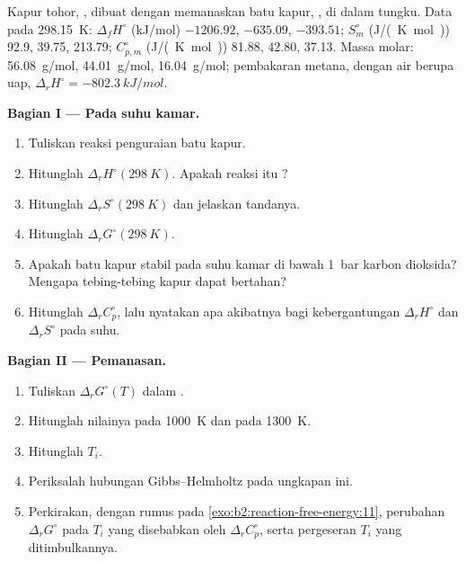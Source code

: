 \begin{problem}
\label{pb:b2:reaction-free-energy:1}
Kapur tohor, , dibuat dengan memanaskan batu kapur, ,
di dalam tungku. Data pada \qty{298.15}{K}: $\Delta_f H^\circ$
(\unit{kJ/mol})  $-1206.92$,  $-635.09$,
 $-393.51$; $S^\circ_m$ (\unit{J/(K.mol)}) 92.9, 39.75, 213.79;
$C^\circ_{p,m}$ (\unit{J/(K.mol)}) 81.88, 42.80, 37.13. Massa molar:
 \qty{56.08}{g/mol},  \qty{44.01}{g/mol}, 
\qty{16.04}{g/mol}; pembakaran metana, dengan air berupa uap,
$\Delta_r H^\circ = \qty{-802.3}{kJ/mol}$.

\medskip
\noindent\textbf{Bagian I --- Pada suhu kamar.}
\begin{enumerate}
  \item Tuliskan reaksi penguraian batu kapur.
  \item Hitunglah $\Delta_r H^\circ(\qty{298}{K})$. Apakah reaksi itu
        ?
  \item Hitunglah $\Delta_r S^\circ(\qty{298}{K})$ dan jelaskan tandanya.
  \item Hitunglah $\Delta_r G^\circ(\qty{298}{K})$.
  \item Apakah batu kapur stabil pada suhu kamar di bawah \qty{1}{bar}
        karbon dioksida? Mengapa tebing-tebing kapur dapat bertahan?
  \item Hitunglah $\Delta_r C^\circ_p$, lalu nyatakan apa akibatnya bagi
        kebergantungan $\Delta_r H^\circ$ dan $\Delta_r S^\circ$ pada
        suhu.
\end{enumerate}

\medskip
\noindent\textbf{Bagian II --- Pemanasan.}
\begin{enumerate}[resume]
  \item Tuliskan $\Delta_r G^\circ(T)$ dalam .
  \item Hitunglah nilainya pada \qty{1000}{K} dan pada \qty{1300}{K}.
  \item Hitunglah  $T_i$.
  \item Periksalah hubungan Gibbs--Helmholtz pada ungkapan ini.
  \item Perkirakan, dengan rumus pada \cref{exo:b2:reaction-free-energy:11},
        perubahan $\Delta_r G^\circ$ pada $T_i$ yang disebabkan oleh
        $\Delta_r C^\circ_p$, serta pergeseran $T_i$ yang ditimbulkannya.
\end{enumerate}


\end{problem}
